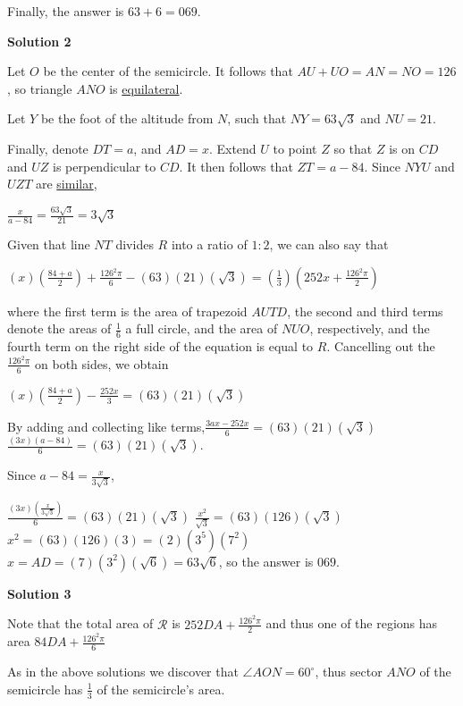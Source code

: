 \begin{enumerate}
 Finally, the answer is $63 + 6 = \boxed{069}$.

 



\textbf{Solution 2}

Let $O$ be the center of the semicircle. It follows that $AU + UO = AN = NO = 126$, so triangle $ANO$ is \href{https://artofproblemsolving.com/wiki/index.php?title=Equilateral}{equilateral}.

 Let $Y$ be the foot of the altitude from $N$, such that $NY = 63\sqrt{3}$ and $NU = 21$.

 Finally, denote $DT = a$, and $AD = x$. Extend $U$ to point $Z$ so that $Z$ is on $CD$ and $UZ$ is perpendicular to $CD$. It then follows that $ZT = a-84$. Since $NYU$ and $UZT$ are \href{https://artofproblemsolving.com/wiki/index.php?title=Similar}{similar},

 $\frac {x}{a-84} = \frac {63\sqrt{3}}{21} = 3\sqrt{3}$

 Given that line $NT$ divides $R$ into a ratio of $1:2$, we can also say that

 $(x)(\frac{84+a}{2}) + \frac {126^2\pi}{6} - (63)(21)(\sqrt{3}) = (\frac{1}{3})(252x + \frac{126^2\pi}{2})$

 where the first term is the area of trapezoid $AUTD$, the second and third terms denote the areas of $\frac{1}{6}$ a full circle, and the area of $NUO$, respectively, and the fourth term on the right side of the equation is equal to $R$. Cancelling out the $\frac{126^2\pi}{6}$ on both sides, we obtain

 $(x)(\frac{84+a}{2}) - \frac{252x}{3} = (63)(21)(\sqrt{3})$

 By adding and collecting like terms,$\frac{3ax - 252x}{6} = (63)(21)(\sqrt{3})$
$\frac{(3x)(a-84)}{6} = (63)(21)(\sqrt{3})$.

 Since $a - 84 = \frac{x}{3\sqrt{3}}$,

 $\frac {(3x)(\frac{x}{3\sqrt{3}})}{6} = (63)(21)(\sqrt{3})$
$\frac {x^2}{\sqrt{3}} = (63)(126)(\sqrt{3})$
$x^2 = (63)(126)(3) = (2)(3^5)(7^2)$
$x = AD = (7)(3^2)(\sqrt{6}) = 63\sqrt{6}$, so the answer is $\boxed{069}.$




\textbf{Solution 3}

Note that the total area of $\mathcal{R}$ is $252DA + \frac {126^2 \pi}{2}$ and thus one of the regions has area $84DA + \frac {126^2 \pi}{6}$

 As in the above solutions we discover that $\angle AON = 60^\circ$, thus sector $ANO$ of the semicircle has $\frac{1}{3}$ of the semicircle's area.


\end{enumerate}

